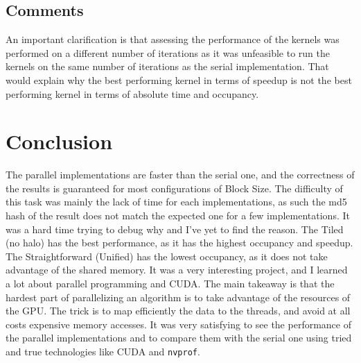 \documentclass{article}
\begin{document}
\subsection{Comments}
An important clarification is that assessing the performance of the kernels was performed on a different number of iterations as it was unfeasible to run the kernels on the same number of iterations as the serial implementation. That would explain why the best performing kernel in terms of speedup is not the best performing kernel in terms of absolute time and occupancy.

\newpage

\section{Conclusion}
The parallel implementations are faster than the serial one, and the correctness of the results is guaranteed for most configurations of Block Size. The difficulty of this task was mainly the lack of time for each implementations, as such the md5 hash of the result does not match the expected one for a few implementations. It was a hard time trying to debug why and I've yet to find the reason. The Tiled (no halo) has the best performance, as it has the highest occupancy and speedup. The Straightforward (Unified) has the lowest occupancy, as it does not take advantage of the shared memory. It was a very interesting project, and I learned a lot about parallel programming and CUDA. The main takeaway is that the hardest part of parallelizing an algorithm is to take advantage of the resources of the GPU. The trick is to map efficiently the data to the threads, and avoid at all costs expensive memory accesses. It was very satisfying to see the performance of the parallel implementations and to compare them with the serial one using tried and true technologies like CUDA and \texttt{nvprof}.
\end{document}
